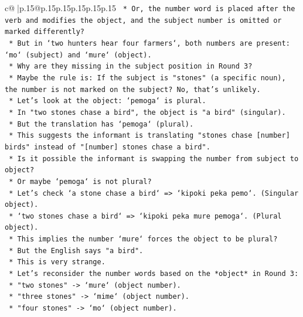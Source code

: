 \documentclass{article}
\begin{document}
{\begin{supertabular}{c@{$\;$}|p{.15\linewidth}@{}p{.15\linewidth}p{.15\linewidth}p{.15\linewidth}p{.15\linewidth}p{.15\linewidth}}
{{{\texttt{                *   Or, the number word is placed after the verb and modifies the object, and the subject number is omitted or marked differently?} \\
\texttt{                *   But in `two hunters hear four farmers`, both numbers are present: `mo` (subject) and `mure` (object).} \\
\texttt{                *   Why are they missing in the subject position in Round 3?} \\
\texttt{                *   Maybe the rule is: If the subject is "stones" (a specific noun), the number is not marked on the subject? No, that's unlikely.} \\
\texttt{                *   Let's look at the object: `pemoga` is plural.} \\
\texttt{                *   In "two stones chase a bird", the object is "a bird" (singular).} \\
\texttt{                *   But the translation has `pemoga` (plural).} \\
\texttt{                *   This suggests the informant is translating "stones chase {[}number{]} birds" instead of "{[}number{]} stones chase a bird".} \\
\texttt{                *   Is it possible the informant is swapping the number from subject to object?} \\
\texttt{                *   Or maybe `pemoga` is not plural?} \\
\texttt{                *   Let's check `a stone chase a bird` => `kipoki peka pemo`. (Singular object).} \\
\texttt{                *   `two stones chase a bird` => `kipoki peka mure pemoga`. (Plural object).} \\
\texttt{                *   This implies the number `mure` forces the object to be plural?} \\
\texttt{                *   But the English says "a bird".} \\
\texttt{                *   This is very strange.} \\
\texttt{                *   Let's reconsider the number words based on the *object* in Round 3:} \\
\texttt{                    *   "two stones" {-}> `mure` (object number).} \\
\texttt{                    *   "three stones" {-}> `mime` (object number).} \\
\texttt{                    *   "four stones" {-}> `mo` (object number).} \\
}}}
\end{supertabular}}
\end{document}
